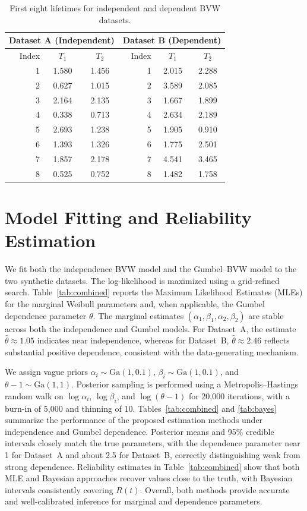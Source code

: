 \documentclass[twoside]{article}
\theoremstyle{plain}
\theoremstyle{definition}
\begin{document}
\begin{table}[h!]
\centering
\caption{First eight lifetimes for independent and dependent BVW datasets.}
\begin{tabular}{@{}rccrcc@{}}
\toprule
\multicolumn{3}{c}{Dataset A (Independent)} 
& \multicolumn{3}{c}{Dataset B (Dependent)} \\ \hline
Index & $T_1$ & $T_2$ & Index & $T_1$ & $T_2$ \\  \hline
\midrule
1 & 1.580 & 1.456 & 1 & 2.015 & 2.288 \\ \hline
2 & 0.627 & 1.015 & 2 & 3.589 & 2.085 \\ \hline
3 & 2.164 & 2.135 & 3 & 1.667 & 1.899 \\ \hline
4 & 0.338 & 0.713 & 4 & 2.634 & 2.189 \\ \hline
5 & 2.693 & 1.238 & 5 & 1.905 & 0.910 \\ \hline
6 & 1.393 & 1.326 & 6 & 1.775 & 2.501 \\ \hline
7 & 1.857 & 2.178 & 7 & 4.541 & 3.465 \\ \hline
8 & 0.525 & 0.752 & 8 & 1.482 & 1.758 \\ 
\bottomrule
\end{tabular}
\label{tab:sample}
\end{table}

\section{Model Fitting and Reliability Estimation}\label{sec:fitting}
We fit both the independence BVW model and the Gumbel–BVW model to the two synthetic datasets.
The log-likelihood is maximized using a grid-refined search. 
Table~\ref{tab:combined} reports the Maximum Likelihood Estimates (MLEs) for the marginal Weibull parameters and, when applicable, the Gumbel dependence parameter $\theta$. The marginal estimates 
$(\alpha_1,\beta_1,\alpha_2,\beta_2)$ are stable across both the independence and Gumbel models. 
For Dataset~A, the estimate $\hat{\theta}\approx 1.05$ indicates near independence, whereas for Dataset~B, 
$\hat{\theta}\approx 2.46$ reflects substantial positive dependence, consistent with the data-generating mechanism.

We assign vague priors 
$\alpha_i\sim\mathrm{Ga}(1,0.1)$, 
$\beta_i\sim\mathrm{Ga}(1,0.1)$, 
and $\theta-1\sim\mathrm{Ga}(1,1)$. 
Posterior sampling is performed using a Metropolis–Hastings random walk on 
$\log\alpha_i$, $\log\beta_i$, and $\log(\theta-1)$ for 20{,}000 iterations, with a burn-in of 5{,}000 and thinning of 10.
Tables~\ref{tab:combined} and \ref{tab:bayes} summarize the performance of the proposed estimation methods under independence and Gumbel dependence. Posterior means and 95\% credible intervals closely match the true parameters, with the dependence parameter near 1 for Dataset~A and about 2.5 for Dataset~B, correctly distinguishing weak from strong dependence. Reliability estimates in Table~\ref{tab:combined} show that both MLE and Bayesian approaches recover values close to the truth, with Bayesian intervals consistently covering $R(t)$. Overall, both methods provide accurate and well-calibrated inference for marginal and dependence parameters.
\end{document}
